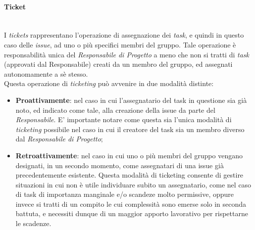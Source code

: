 \paragraph{Ticket} ~\\
	I \textit{tickets} rappresentano l'operazione di assegnazione dei \textit{task}, e quindi in questo caso delle \textit{issue}, ad uno o più specifici membri del gruppo. Tale operazione è responsabilità unica del \textit{Responsabile di Progetto} a meno che non si tratti di \textit{task} (approvati dal Responsabile) creati da un membro del gruppo, ed assegnati autonomamente a sè stesso.\\
	Questa operazione di \textit{ticketing} può avvenire in due modalità distinte:
	\begin{itemize}
	\item \textbf{Proattivamente}: nel caso in cui l'assegnatario del task in questione sia già noto, ed indicato come tale, alla creazione della issue da parte del \textit{Responsabile}. E' importante notare come questa sia l'unica modalità di \textit{ticketing} possibile nel caso in cui il creatore del task sia un membro diverso dal \textit{Responsabile di Progetto};
	\item \textbf{Retroattivamente}: nel caso in cui uno o più membri del gruppo vengano designati, in un secondo momento, come assegnatari di una issue già precedentemente esistente. Questa modalità di ticketing consente di gestire situazioni in cui non è utile individuare subito un assegnatario, come nel caso di task di importanza manginale e/o scandeze molto permissive, oppure invece si tratti di un compito le cui complessità sono emerse solo in seconda battuta, e necessiti dunque di un maggior apporto lavorativo per rispettarne le scadenze.
	\end{itemize}
